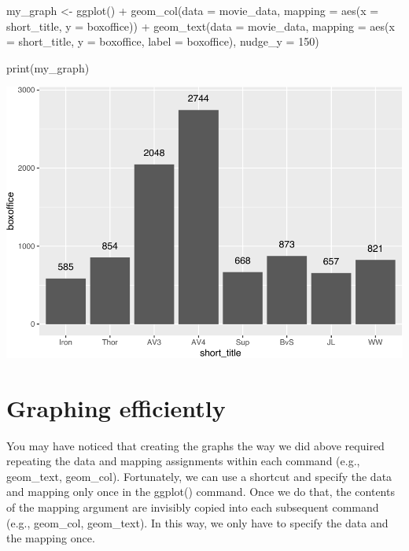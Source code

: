 \documentclass[
]{krantz}
\makeatletter
\newenvironment{Shaded}{\begin{snugshade}}{\end{snugshade}}
\newcommand{\AttributeTok}[1]{\textcolor[rgb]{0.61,0.61,0.61}{#1}}
\newcommand{\DecValTok}[1]{\textcolor[rgb]{0.06,0.06,0.06}{#1}}
\newcommand{\FunctionTok}[1]{\textcolor[rgb]{0,0,0}{#1}}
\newcommand{\NormalTok}[1]{#1}
\newcommand{\OtherTok}[1]{\textcolor[rgb]{0.37,0.37,0.37}{#1}}
\newcommand{\SpecialCharTok}[1]{\textcolor[rgb]{0,0,0}{#1}}
\newenvironment{kframe}{%
\medskip{}
\setlength{\fboxsep}{.8em}
 \def\at@end@of@kframe{}%
 \ifinner\ifhmode%
  \def\at@end@of@kframe{\end{minipage}}%
  \begin{minipage}{\columnwidth}%
 \fi\fi%
 \def\FrameCommand##1{\hskip\@totalleftmargin \hskip-\fboxsep
 \colorbox{shadecolor}{##1}\hskip-\fboxsep
     \hskip-\linewidth \hskip-\@totalleftmargin \hskip\columnwidth}%
 \MakeFramed {\advance\hsize-\width
   \@totalleftmargin\z@ \linewidth\hsize
   \@setminipage}}%
 {\par\unskip\endMakeFramed%
 \at@end@of@kframe}
\renewenvironment{Shaded}{\begin{kframe}}{\end{kframe}}
\makeatother
\begin{document}
\begin{Shaded}
\begin{Highlighting}[]
\NormalTok{my\_graph }\OtherTok{\textless{}{-}} \FunctionTok{ggplot}\NormalTok{() }\SpecialCharTok{+}
  \FunctionTok{geom\_col}\NormalTok{(}\AttributeTok{data =}\NormalTok{ movie\_data,}
           \AttributeTok{mapping =} \FunctionTok{aes}\NormalTok{(}\AttributeTok{x =}\NormalTok{ short\_title, }
                         \AttributeTok{y =}\NormalTok{ boxoffice)) }\SpecialCharTok{+}
  \FunctionTok{geom\_text}\NormalTok{(}\AttributeTok{data =}\NormalTok{ movie\_data, }
           \AttributeTok{mapping =} \FunctionTok{aes}\NormalTok{(}\AttributeTok{x =}\NormalTok{ short\_title, }
                         \AttributeTok{y =}\NormalTok{ boxoffice, }
                         \AttributeTok{label =}\NormalTok{ boxoffice),}
           \AttributeTok{nudge\_y =} \DecValTok{150}\NormalTok{)}

\FunctionTok{print}\NormalTok{(my\_graph)}
\end{Highlighting}
\end{Shaded}

\includegraphics[width=0.65\linewidth]{bookdown_files/figure-latex/unnamed-chunk-108-1}

\hypertarget{graphing-efficiently}{%
\section{Graphing efficiently}\label{graphing-efficiently}}

You may have noticed that creating the graphs the way we did above required repeating the data and mapping assignments within each command (e.g., geom\_text, geom\_col). Fortunately, we can use a shortcut and specify the data and mapping only once in the ggplot() command. Once we do that, the contents of the mapping argument are invisibly copied into each subsequent command (e.g., geom\_col, geom\_text). In this way, we only have to specify the data and the mapping once.
\end{document}

